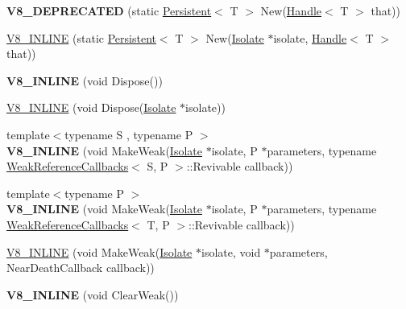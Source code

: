 \begin{DoxyCompactItemize}
\item 
\hypertarget{classv8_1_1_persistent_ae4eaf2280b5caab67c009840f2db26c3}{}{\bfseries V8\+\_\+\+D\+E\+P\+R\+E\+C\+A\+T\+E\+D} (static \hyperlink{classv8_1_1_persistent}{Persistent}$<$ T $>$ New(\hyperlink{classv8_1_1_handle}{Handle}$<$ T $>$ that))\label{classv8_1_1_persistent_ae4eaf2280b5caab67c009840f2db26c3}

\item 
\hyperlink{classv8_1_1_persistent_ad38190b1fcec742b889e3850e41525dc}{V8\+\_\+\+I\+N\+L\+I\+N\+E} (static \hyperlink{classv8_1_1_persistent}{Persistent}$<$ T $>$ New(\hyperlink{classv8_1_1_isolate}{Isolate} $\ast$isolate, \hyperlink{classv8_1_1_handle}{Handle}$<$ T $>$ that))
\item 
\hypertarget{classv8_1_1_persistent_adae44eb24d3c568f9ab948d3efd3dbfa}{}{\bfseries V8\+\_\+\+I\+N\+L\+I\+N\+E} (void Dispose())\label{classv8_1_1_persistent_adae44eb24d3c568f9ab948d3efd3dbfa}

\item 
\hyperlink{classv8_1_1_persistent_aa0f3928a4dd02a35d174299346673846}{V8\+\_\+\+I\+N\+L\+I\+N\+E} (void Dispose(\hyperlink{classv8_1_1_isolate}{Isolate} $\ast$isolate))
\item 
\hypertarget{classv8_1_1_persistent_a219c85987aa0da2aebd346eaed8e1ea3}{}{\footnotesize template$<$typename S , typename P $>$ }\\{\bfseries V8\+\_\+\+I\+N\+L\+I\+N\+E} (void Make\+Weak(\hyperlink{classv8_1_1_isolate}{Isolate} $\ast$isolate, P $\ast$parameters, typename \hyperlink{classv8_1_1_weak_reference_callbacks}{Weak\+Reference\+Callbacks}$<$ S, P $>$\+::Revivable callback))\label{classv8_1_1_persistent_a219c85987aa0da2aebd346eaed8e1ea3}

\item 
\hypertarget{classv8_1_1_persistent_a3109f3db13fe2a4bfca230168ef8c6b8}{}{\footnotesize template$<$typename P $>$ }\\{\bfseries V8\+\_\+\+I\+N\+L\+I\+N\+E} (void Make\+Weak(\hyperlink{classv8_1_1_isolate}{Isolate} $\ast$isolate, P $\ast$parameters, typename \hyperlink{classv8_1_1_weak_reference_callbacks}{Weak\+Reference\+Callbacks}$<$ T, P $>$\+::Revivable callback))\label{classv8_1_1_persistent_a3109f3db13fe2a4bfca230168ef8c6b8}

\item 
\hyperlink{classv8_1_1_persistent_a631a69324036a9863739c73579c91da2}{V8\+\_\+\+I\+N\+L\+I\+N\+E} (void Make\+Weak(\hyperlink{classv8_1_1_isolate}{Isolate} $\ast$isolate, void $\ast$parameters, Near\+Death\+Callback callback))
\item 
\hypertarget{classv8_1_1_persistent_aef009f9e3c6e0ac21cdbad2907686ac3}{}{\bfseries V8\+\_\+\+I\+N\+L\+I\+N\+E} (void Clear\+Weak())\label{classv8_1_1_persistent_aef009f9e3c6e0ac21cdbad2907686ac3}


\end{DoxyCompactItemize}

